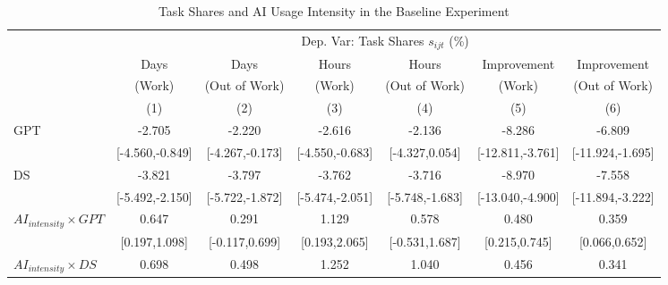 \begin{table}[H]
\centering
\caption{Task Shares and AI Usage Intensity in the Baseline Experiment}
\footnotesize
\begin{threeparttable}
\begin{tabular}{l*{6}{c}}
\toprule\toprule
& \multicolumn{6}{c}{Dep. Var: Task Shares $s_{ijt}$ (\%)} \\
\cmidrule(lr){2-7}
& Days & Days & Hours & Hours & Improvement & Improvement \\
& (Work) & (Out of Work) & (Work) & (Out of Work) & (Work) & (Out of Work) \\
            &\multicolumn{1}{c}{(1)}         &\multicolumn{1}{c}{(2)}         &\multicolumn{1}{c}{(3)}         &\multicolumn{1}{c}{(4)}         &\multicolumn{1}{c}{(5)}         &\multicolumn{1}{c}{(6)}         \\
\midrule
GPT         &                -2.705\sym{**} &                -2.220\sym{*}  &                -2.616\sym{**} &                -2.136         &                -8.286\sym{***}&                -6.809\sym{**} \\
            &       [-4.560,-0.849]         &       [-4.267,-0.173]         &       [-4.550,-0.683]         &        [-4.327,0.054]         &      [-12.811,-3.761]         &      [-11.924,-1.695]         \\
\addlinespace
DS          &                -3.821\sym{***}&                -3.797\sym{***}&                -3.762\sym{***}&                -3.716\sym{***}&                -8.970\sym{***}&                -7.558\sym{***}\\
            &       [-5.492,-2.150]         &       [-5.722,-1.872]         &       [-5.474,-2.051]         &       [-5.748,-1.683]         &      [-13.040,-4.900]         &      [-11.894,-3.222]         \\
\addlinespace
$AI_{intensity} \times GPT$&                 0.647\sym{**} &                 0.291         &                 1.129\sym{*}  &                 0.578         &                 0.480\sym{***}&                 0.359\sym{*}  \\
            &         [0.197,1.098]         &        [-0.117,0.699]         &         [0.193,2.065]         &        [-0.531,1.687]         &         [0.215,0.745]         &         [0.066,0.652]         \\
\addlinespace
$AI_{intensity} \times DS$&                 0.698\sym{**} &                 0.498\sym{*}  &                 1.252\sym{**} &                 1.040         &                 0.456\sym{***}&                 0.341\sym{**} \\

\end{tabular}
\end{threeparttable}
\end{table}
